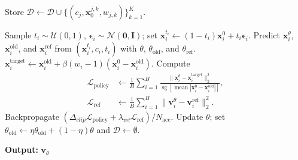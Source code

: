 \begin{algorithm}[H]
\begin{algorithmic}[1]
                \State Store
                $\mathcal{D}\leftarrow\mathcal{D}\cup
                \{(c_j,\mathbf{x}_0^{j,k},w_{j,k})\}_{k=1}^{K}$.
            \EndFor

                \State Sample $t_i\sim\mathcal{U}(0,1)$,
                $\boldsymbol{\epsilon}_i\sim\mathcal{N}(\mathbf{0},\mathbf{I})$;
                set $\mathbf{x}_i^{t_i}\leftarrow
                (1-t_i)\mathbf{x}_i^0+t_i\boldsymbol{\epsilon}_i$.
                \State Predict $\mathbf{x}_i^\theta$,
                $\mathbf{x}_i^{\mathrm{old}}$, and $\mathbf{x}_i^{\mathrm{ref}}$
                from $(\mathbf{x}_i^{t_i},c_i,t_i)$ with
                $\theta$, $\theta_{\mathrm{old}}$, and $\theta_{\mathrm{ref}}$.
                \State $\mathbf{x}_i^{\mathrm{target}}\leftarrow
                \mathbf{x}_i^{\mathrm{old}}+
                \beta(w_i-1)(\mathbf{x}_i^0-\mathbf{x}_i^{\mathrm{old}})$.
                \State Compute
                \[
                    \begin{aligned}
                    \mathcal{L}_{\mathrm{policy}}
                    &\leftarrow\frac{1}{B}\sum_{i=1}^{B}
                    \frac{\|\mathbf{x}_i^\theta-\mathbf{x}_i^{\mathrm{target}}\|_2^2}
                    {\operatorname{sg}[\operatorname{mean}
                    |\mathbf{x}_i^0-\mathbf{x}_i^{\mathrm{old}}|]},\\
                    \mathcal{L}_{\mathrm{ref}}
                    &\leftarrow\frac{1}{B}\sum_{i=1}^{B}
                    \|\mathbf{v}_i^\theta-\mathbf{v}_i^{\mathrm{ref}}\|_2^2.
                    \end{aligned}
                \]
                \State Backpropagate
                $(\Delta_{clip}\mathcal{L}_{\mathrm{policy}}+
                \lambda_{\mathrm{ref}}\mathcal{L}_{\mathrm{ref}})/N_{\mathrm{acc}}$.
            \EndFor
            \State Update $\theta$; set
            $\theta_{\mathrm{old}}\leftarrow
            \eta\theta_{\mathrm{old}}+(1-\eta)\theta$ and
            $\mathcal{D}\leftarrow\emptyset$.
        \EndFor
    \end{algorithmic}
    \textbf{Output:} $\mathbf{v}_\theta$
\end{algorithm}


